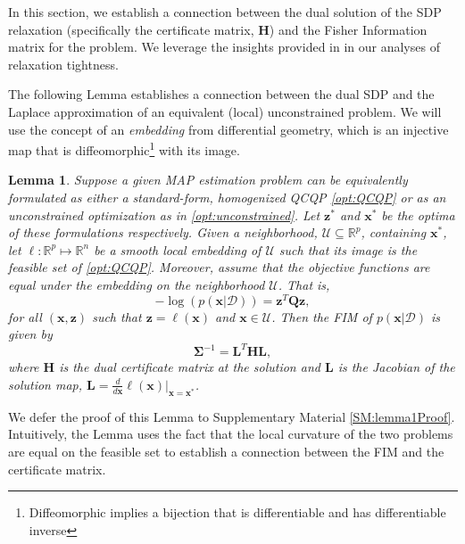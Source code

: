 \documentclass[lettersize,journal]{IEEEtran}
\newtheorem{lemma}[theorem]{Lemma}
\begin{document}
{In this section, we establish a connection between the dual solution of the SDP relaxation (specifically the certificate matrix, $\bm{H}$) and the Fisher Information matrix for the problem. We leverage the insights provided in \cite{zhangDegeneracyOptimizationbasedState2016} in our analyses of relaxation tightness. 

The following Lemma establishes a connection between the dual SDP and the Laplace approximation of an equivalent (local) unconstrained problem. We will use the concept of an \emph{embedding} from differential geometry, which is an injective map that is diffeomorphic\footnote{Diffeomorphic implies a bijection that is differentiable and has differentiable inverse} with its image. 

\begin{lemma}\label{thm:FisherInfo}
	Suppose a given MAP estimation problem can be equivalently formulated as either a standard-form, homogenized QCQP \eqref{opt:QCQP} or as an unconstrained optimization as in \eqref{opt:unconstrained}. Let $\bm{z}^*$ and $\bm{x}^*$ be the optima of these formulations respectively. Given a neighborhood, $\mathcal{U} \subseteq \mathbb{R}^p$, containing $\bm{x}^*$, let $\bm{\ell}: \mathbb{R}^p \mapsto \mathbb{R}^n$ be a \emph{smooth local embedding} of $\mathcal{U}$ such that its image is the feasible set of \eqref{opt:QCQP}. Moreover, assume that the objective functions are equal under the embedding on the neighborhood $\mathcal{U}$. That is,
	\begin{equation}
		-\log\left(p(\bm{x} \vert \bm{\mathcal{D}})\right) = \bm{z}^T \bm{Q} \bm{z},
	\end{equation}
	for all $(\bm{x}, \bm{z})$ such that $\bm{z}=\mathbb{\ell}(\bm{x})$ and $\bm{x} \in \mathcal{U}$. Then the FIM of $p(\bm{x} \vert \bm{\mathcal{D}})$ is given by
	\begin{equation}
		\bm{\Sigma}^{-1}= \bm{L}^T \bm{H}\bm{L},
	\end{equation}
	where $\bm{H}$ is the dual certificate matrix at the solution and $\bm{L}$ is the Jacobian of the solution map, $\bm{L} = \frac{d}{d\bm{x}}\bm{\ell}(\bm{x})\vert_{\bm{x}=\bm{x}^*}$. 
\end{lemma}

We defer the proof of this Lemma to Supplementary Material \ref{SM:lemma1Proof}. Intuitively, the Lemma uses the fact that the local curvature of the two problems are equal on the feasible set to establish a connection between the FIM and the certificate matrix. 

}
\end{document}

